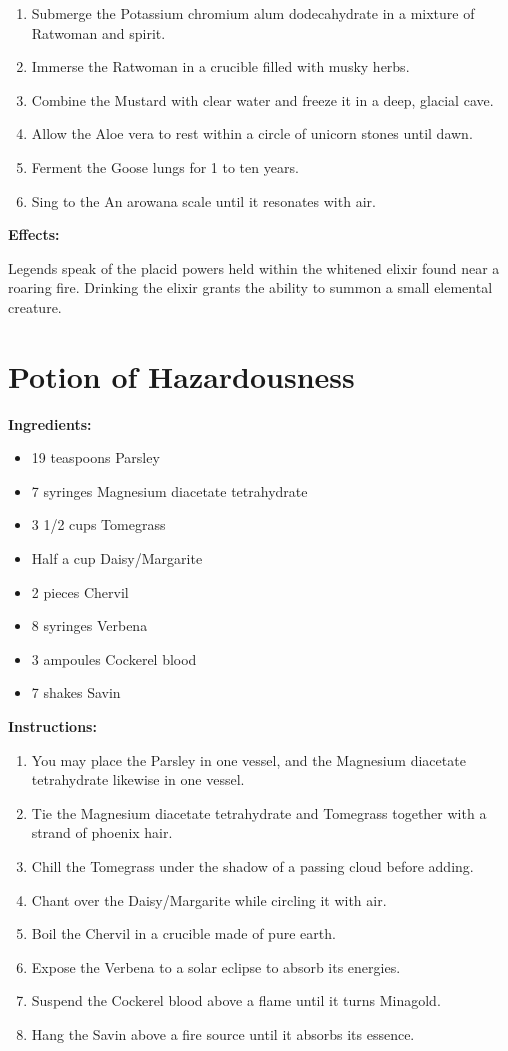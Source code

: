 \documentclass{article}
\begin{document}
\begin{enumerate}
  \item Submerge the Potassium chromium alum dodecahydrate in a mixture of Ratwoman and spirit.
  \item Immerse the Ratwoman in a crucible filled with musky herbs.
  \item Combine the Mustard with clear water and freeze it in a deep, glacial cave.
  \item Allow the Aloe vera to rest within a circle of unicorn stones until dawn.
  \item Ferment the Goose lungs for 1 to ten years.
  \item Sing to the An arowana scale until it resonates with air.
\end{enumerate}

\textbf{Effects:}

Legends speak of the placid powers held within the whitened elixir found near a roaring fire. Drinking the elixir grants the ability to summon a small elemental creature.

\newpage
\section*{Potion of Hazardousness}

\textbf{Ingredients:}

\begin{itemize}
  \item 19 teaspoons Parsley
  \item 7 syringes Magnesium diacetate tetrahydrate
  \item 3 1/2 cups Tomegrass
  \item Half a cup Daisy/Margarite
  \item 2 pieces Chervil
  \item 8 syringes Verbena
  \item 3 ampoules Cockerel blood
  \item 7 shakes Savin
\end{itemize}

\textbf{Instructions:}

\begin{enumerate}
  \item You may place the Parsley in one vessel, and the Magnesium diacetate tetrahydrate likewise in one vessel.
  \item Tie the Magnesium diacetate tetrahydrate and Tomegrass together with a strand of phoenix hair.
  \item Chill the Tomegrass under the shadow of a passing cloud before adding.
  \item Chant over the Daisy/Margarite while circling it with air.
  \item Boil the Chervil in a crucible made of pure earth.
  \item Expose the Verbena to a solar eclipse to absorb its energies.
  \item Suspend the Cockerel blood above a flame until it turns Minagold.
  \item Hang the Savin above a fire source until it absorbs its essence.
\end{enumerate}
\end{document}
